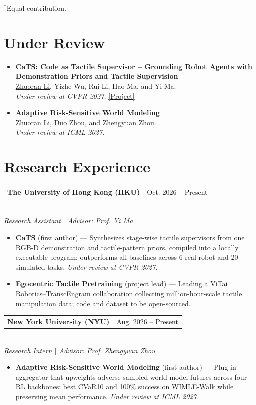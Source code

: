 \documentclass[a4paper,11pt]{article}
\makeatletter
\newcommand{\datedline}[2]{%
  \begin{tabularx}{\textwidth}{@{}>{\raggedright\arraybackslash}X>{\raggedleft\arraybackslash}p{0.34\textwidth}@{}}
    #1 & #2
  \end{tabularx}%
}
\newcommand{\experience}[3]{%
  \par\noindent
  \datedline{\textbf{#1}}{#2}\\[-1pt]
  {\small\textit{#3}}\vspace{1pt}
}
\newcommand{\publink}[2]{%
  \href{#1}{[#2]}%
}
\newcommand{\advisor}[2]{\href{#1}{#2}}
\newcommand{\publication}[4]{%
  \item[] \textbf{#1}\\[-1pt]
  #2\\[-1pt]
  \textit{#3}\hspace{0.45em}#4
}
\makeatother
\begin{document}
\vspace{-3pt}
{\small $^{*}$Equal contribution.}

\section{Under Review}
\begin{itemize}[leftmargin=0pt,label={},itemsep=2.5pt,topsep=1pt]
  \publication
    {CaTS: Code as Tactile Supervisor -- Grounding Robot Agents with Demonstration Priors and Tactile Supervision}
    {\underline{Zhuoran Li}, Yizhe Wu, Rui Li, Hao Ma, and Yi Ma.}
    {Under review at CVPR 2027.}
    {\publink{https://iairplane.github.io/tactile_agent_page/}{Project}}

  \publication
    {Adaptive Risk-Sensitive World Modeling}
    {\underline{Zhuoran Li}, Duo Zhou, and Zhengyuan Zhou.}
    {Under review at ICML 2027.}
    {}

\end{itemize}

\section{Research Experience}
\experience{The University of Hong Kong (HKU)}{Oct. 2026 -- Present}
{Research Assistant $\vert$ Advisor: Prof. \advisor{https://www.ai.hku.hk/people/academic-staff/mayi}{Yi Ma}}
\begin{itemize}
  \item \textbf{CaTS} (first author) --- Synthesizes stage-wise tactile supervisors from one RGB-D demonstration
  and tactile-pattern priors, compiled into a locally executable program; outperforms all baselines across
  6 real-robot and 20 simulated tasks. \textit{Under review at CVPR 2027.}
  \item \textbf{Egocentric Tactile Pretraining} (project lead) --- Leading a ViTai Robotics--TranscEngram
  collaboration collecting million-hour-scale tactile manipulation data; code and dataset to be open-sourced.
\end{itemize}

\experience{New York University (NYU)}{Aug. 2026 -- Present}
{Research Intern $\vert$ Advisor: Prof. \advisor{https://engineering.nyu.edu/faculty/zhengyuan-zhou}{Zhengyuan Zhou}}
\begin{itemize}
  \item \textbf{Adaptive Risk-Sensitive World Modeling} (first author) --- Plug-in aggregator that upweights adverse sampled world-model futures across four
  RL backbones; best CVaR10 and 100\% success on WIMLE-Walk while preserving mean performance.
  \textit{Under review at ICML 2027.}
\end{itemize}
\end{document}
